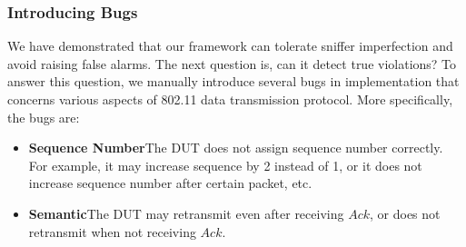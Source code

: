 \subsubsection{Introducing Bugs}

We have demonstrated that our framework can tolerate sniffer imperfection and
avoid raising false alarms. 
The next question is, can it detect true violations?
To answer this question, we manually introduce several bugs in \ns{}
implementation that concerns various aspects of 802.11 data transmission
protocol.
More specifically, the bugs are:

\begin{itemize}
  \item \textbf{Sequence Number}\quad The DUT does not assign sequence number
    correctly. For example, it may increase sequence by 2 instead of 1, or it
    does not increase sequence number after certain packet, etc. 
  \item \textbf{Semantic}\quad The DUT may retransmit even
    after receiving $Ack$, or does not retransmit when not receiving $Ack$.
\end{itemize}

